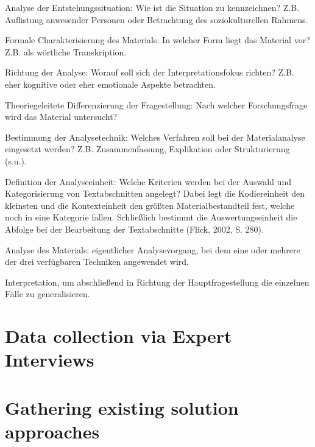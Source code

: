 Analyse der Entstehungssituation: Wie ist die Situation zu kenn­zeichnen? Z.B. Auflistung anwesender Personen oder Betrachtung des soziokulturellen Rahmens.

Formale Charakterisierung des Materials: In welcher Form liegt das Material vor? Z.B. als wörtliche Transkription.

Richtung der Analyse: Worauf soll sich der Interpretationsfokus richten? Z.B. eher kognitive oder eher emotionale Aspekte be­trachten.

Theoriegeleitete Differenzierung der Fragestellung: Nach welcher Forschungsfrage wird das Material untersucht?

Bestimmung der Analysetechnik: Welches Verfahren soll bei der Materialanalyse eingesetzt werden? Z.B. Zusammenfassung, Explikation oder Strukturierung (s.u.).

Definition der Analyseeinheit: Welche Kriterien werden bei der Auswahl und Kategorisierung von Textabschnitten angelegt? Dabei legt die Kodiereinheit den kleinsten und die Kontexteinheit den größten Materialbestandteil fest, welche noch in eine Kategorie fallen. Schließlich bestimmt die Auswertungseinheit die Abfolge bei der Bearbeitung der Textabschnitte (Flick, 2002, S. 280).

Analyse des Materials: eigentlicher Analysevorgang, bei dem eine oder mehrere der drei verfügbaren Techniken angewendet wird.

Interpretation, um abschließend in Richtung der Hauptfragestellung die einzelnen Fälle zu generalisieren.

\section{Data collection via Expert Interviews}

\section{Gathering existing solution approaches}